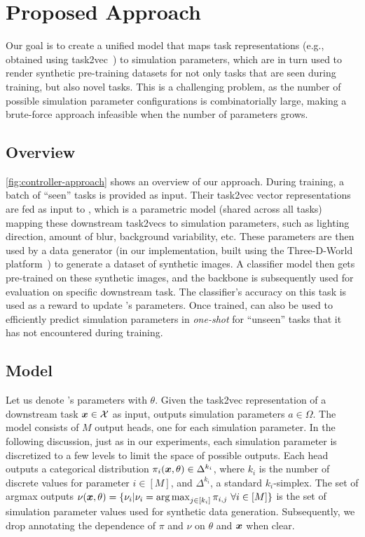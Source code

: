 








\section{Proposed Approach} \label{sec:method}

Our goal is to create a unified model that maps task representations (e.g., obtained using task2vec~\cite{achille2019task2vec}) to simulation parameters, which are in turn used to render synthetic pre-training datasets for not only tasks that are seen during training, but also novel tasks.
This is a challenging problem, as the number of possible simulation parameter configurations is combinatorially large, making a brute-force approach infeasible when the number of parameters grows. 

\subsection{Overview} 

\cref{fig:controller-approach} shows an overview of our approach. During training, a batch of ``seen'' tasks is provided as input. Their task2vec vector representations are fed as input to \ours, which is a parametric model (shared across all tasks) mapping these downstream task2vecs to simulation parameters, such as lighting direction, amount of blur, background variability, etc.  These parameters are then used by a data generator (in our implementation, built using the Three-D-World platform~\cite{gan2020threedworld}) to generate a dataset of synthetic images. A classifier model then gets pre-trained on these synthetic images, and the backbone is subsequently used for evaluation on specific downstream task. The classifier's accuracy on this task is used as a reward to update \ours's parameters. 
Once trained, \ours can also be used to efficiently predict simulation parameters in {\em one-shot} for ``unseen'' tasks that it has not encountered during training. 


\subsection{\ours Model} 


Let us denote \ours's parameters with $\theta$. Given the task2vec representation of a downstream task $\boldsymbol{x} \in \mathcal{X}$ as input, \ours outputs simulation parameters $a \in \Omega$. The model consists of $M$ output heads, one for each simulation parameter. In the following discussion, just as in our experiments, each simulation parameter is discretized to a few levels to limit the space of possible outputs. Each head outputs a categorical distribution $\pi_i(\boldsymbol{x}, \theta) \in \Delta^{k_i}$, where $k_i$ is the number of discrete values for parameter $i \in [M]$, and $\Delta^{k_i}$, a standard $k_i$-simplex. The set of argmax outputs $\nu(\boldsymbol{x}, \theta) = \{\nu_i | \nu_i = \operatorname*{arg\,max}_{j \in [k_i]} \pi_{i, j} ~\forall i \in [M]\}$ is the set of simulation parameter values used for synthetic data generation. Subsequently, we drop annotating the dependence of $\pi$ and $\nu$ on $\theta$ and $\boldsymbol{x}$ when clear.

